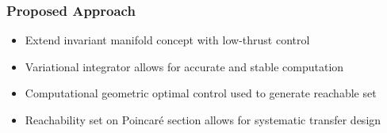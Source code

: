 %	

\begin{frame} %
\frametitle{Proposed Approach}
		\begin{itemize}
			\item Extend invariant manifold concept with low-thrust control  
			\item Variational integrator allows for accurate and stable computation
			\item Computational geometric optimal control used to generate reachable set
			\item Reachability set on Poincar\'e section allows for systematic transfer design
		\end{itemize}
\end{frame} %